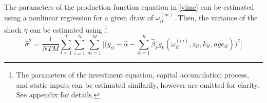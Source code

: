 \documentclass{article}
\begin{document}
\begin{enumerate}
    The parameters of the production function equation in \eqref{yimc} can be estimated using a nonlinear regression for a given draw of $\omega_{it}^{(m)}$. Then, the variance of the shock $\eta$ can be estimated using \footnote{The parameters of the investment equation, capital accumulation process, and static inputs can be estimated similarily, however are omitted for clarity. See appendix for details.}
     \begin{equation}\label{staticyvar}
     \hat{\sigma}^{2}=\frac{1}{NTM}\sum_{t=1}^{T}\sum_{i=1}^{N}\sum_{m=1}^{M}\Bigg[\Bigg(y_{it}-\hat{\alpha}-\sum_{k=1}^{K}\hat{\beta}_{k}g_{k}(\omega_{it}^{(m)}, z_{it}, k_{it}, age_{it})\Bigg)^{2}\Bigg]
     \end{equation}
\end{enumerate}

\pagebreak
\newpage



\end{document}
